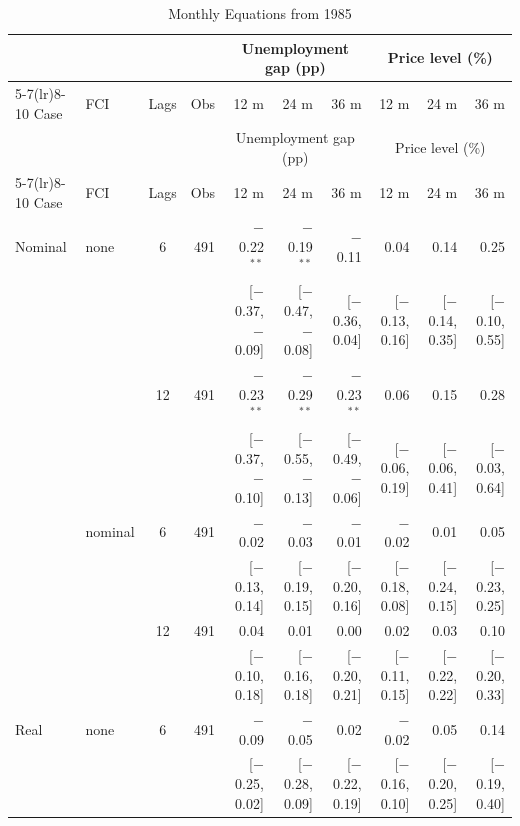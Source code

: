 \begingroup\scriptsize\setlength{\tabcolsep}{0.9pt}
\begin{longtable}{llcrrrrrrr}
\caption{Monthly Equations from 1985}\label{tab:appR6}\\
\toprule
 & & & & \multicolumn{3}{c}{Unemployment gap (pp)} & \multicolumn{3}{c}{Price level (\%)}\\ \cmidrule(lr){5-7}\cmidrule(lr){8-10}
Case & FCI & Lags & Obs & 12 m & 24 m & 36 m & 12 m & 24 m & 36 m\\
\midrule\endfirsthead
\toprule
 & & & & \multicolumn{3}{c}{Unemployment gap (pp)} & \multicolumn{3}{c}{Price level (\%)}\\ \cmidrule(lr){5-7}\cmidrule(lr){8-10}
Case & FCI & Lags & Obs & 12 m & 24 m & 36 m & 12 m & 24 m & 36 m\\
\midrule\endhead
\bottomrule\endfoot
Nominal & none & 6 & 491 & $-$0.22$^{**}$ & $-$0.19$^{**}$ & $-$0.11 & 0.04 & 0.14 & 0.25\\
 & & & & {\scriptsize [$-$0.37, $-$0.09]} & {\scriptsize [$-$0.47, $-$0.08]} & {\scriptsize [$-$0.36, 0.04]} & {\scriptsize [$-$0.13, 0.16]} & {\scriptsize [$-$0.14, 0.35]} & {\scriptsize [$-$0.10, 0.55]}\\
 &  & 12 & 491 & $-$0.23$^{**}$ & $-$0.29$^{**}$ & $-$0.23$^{**}$ & 0.06 & 0.15 & 0.28\\
 & & & & {\scriptsize [$-$0.37, $-$0.10]} & {\scriptsize [$-$0.55, $-$0.13]} & {\scriptsize [$-$0.49, $-$0.06]} & {\scriptsize [$-$0.06, 0.19]} & {\scriptsize [$-$0.06, 0.41]} & {\scriptsize [$-$0.03, 0.64]}\\
 & nominal & 6 & 491 & $-$0.02 & $-$0.03 & $-$0.01 & $-$0.02 & 0.01 & 0.05\\
 & & & & {\scriptsize [$-$0.13, 0.14]} & {\scriptsize [$-$0.19, 0.15]} & {\scriptsize [$-$0.20, 0.16]} & {\scriptsize [$-$0.18, 0.08]} & {\scriptsize [$-$0.24, 0.15]} & {\scriptsize [$-$0.23, 0.25]}\\
 &  & 12 & 491 & 0.04 & 0.01 & 0.00 & 0.02 & 0.03 & 0.10\\
 & & & & {\scriptsize [$-$0.10, 0.18]} & {\scriptsize [$-$0.16, 0.18]} & {\scriptsize [$-$0.20, 0.21]} & {\scriptsize [$-$0.11, 0.15]} & {\scriptsize [$-$0.22, 0.22]} & {\scriptsize [$-$0.20, 0.33]}\\
\addlinespace
Real & none & 6 & 491 & $-$0.09 & $-$0.05 & 0.02 & $-$0.02 & 0.05 & 0.14\\
 & & & & {\scriptsize [$-$0.25, 0.02]} & {\scriptsize [$-$0.28, 0.09]} & {\scriptsize [$-$0.22, 0.19]} & {\scriptsize [$-$0.16, 0.10]} & {\scriptsize [$-$0.20, 0.25]} & {\scriptsize [$-$0.19, 0.40]}\\

\end{longtable}
